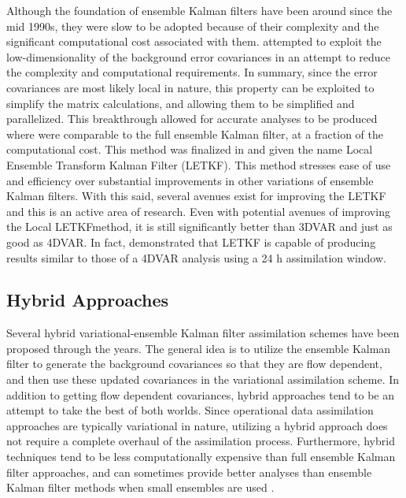 Although the foundation of ensemble Kalman filters have been around since the mid 1990s, they were slow to be adopted because of their complexity and the significant computational cost associated with them. \cite{ott2004local} attempted to exploit the low-dimensionality of the background error covariances in an attempt to reduce the complexity and computational requirements. In summary, since the error covariances are most likely local in nature, this property can be exploited to simplify the matrix calculations, and allowing them to be simplified and parallelized. This breakthrough allowed for accurate analyses to be produced where were comparable to the full ensemble Kalman filter, at a fraction of the computational cost. This method was finalized in \cite{hunt2007letkf} and given the name Local Ensemble Transform Kalman Filter (LETKF). This method stresses ease of use and efficiency over substantial improvements in other variations of ensemble Kalman filters. With this said, several avenues exist for improving the LETKF and this is an active area of research. Even with potential avenues of improving the Local LETKFmethod, it is still significantly better than 3DVAR and just as good as 4DVAR. In fact, \cite{yang2009comparison} demonstrated that LETKF is capable of producing results similar to those of a 4DVAR analysis using a 24 h assimilation window.




\subsection{Hybrid Approaches}

Several hybrid variational-ensemble Kalman filter assimilation schemes have been proposed through the years. The general idea is to utilize the ensemble Kalman filter to generate the background covariances so that they are flow dependent, and then use these updated covariances in the variational assimilation scheme.  In addition to getting flow dependent covariances, hybrid approaches tend to be an attempt to take the best of both worlds.  Since operational data assimilation approaches are typically variational in nature, utilizing a hybrid approach does not require a complete overhaul of the assimilation process.  Furthermore, hybrid techniques tend to be less computationally expensive than full ensemble Kalman filter approaches, and can sometimes provide better analyses than ensemble Kalman filter methods when small ensembles are used \citep{wang2008hybrid}.
